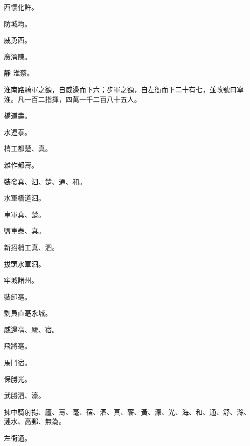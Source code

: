 \begin{pinyinscope}
 西懷化許。



 防城均。



 威勇西。



 廣濟陳。



 靜
 淮蔡。



 淮南路騎軍之額，自威邊而下六；步軍之額，自左衙而下二十有七，並改號曰寧淮。凡一百二指揮，四萬一千二百八十五人。



 橋道壽。



 水運泰。



 梢工都楚、真。



 雜作都壽。



 裝發真、泗、楚、通、和。



 水軍橋道泗。



 車軍真、楚。



 鹽車泰、真。



 新招梢工真、泗。



 拔頭水軍泗。



 牢城諸州。



 裝卸亳。



 剩員直亳永城。



 威邊亳、廬、宿。



 飛將亳。



 馬鬥宿。



 保勝光。



 武勝泗、濠。



 揀中騎射揚、廬、壽、毫、宿、泗、真、蘄、黃、濠、光、海、和、通、舒、滁、漣水、高郵、無為。



 左衙通。




\end{pinyinscope}
